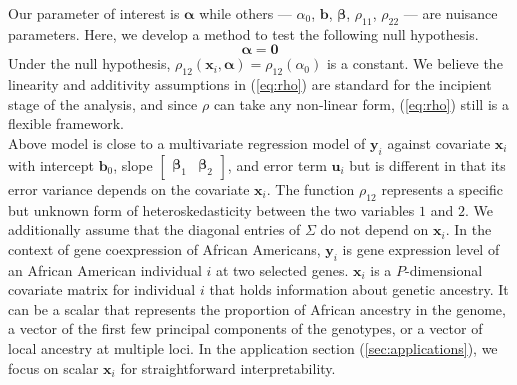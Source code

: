 \documentclass[aap, preprint]{imsart}
\numberwithin{equation}{section}
\theoremstyle{plain}
\begin{document}
Our parameter of interest is $\bm{\alpha}$ while others --- $\alpha_0$, $\bm{b}$, $\bm{\beta}$, $\rho_{11}$, $\rho_{22}$ --- are nuisance parameters. Here, we develop a method to test the following null hypothesis.
\begin{equation}
    \bm{\alpha} = \bm{0}
    \label{eq:null}
\end{equation}
Under the null hypothesis, $\rho_{12}(\bm{x}_i, \bm{\alpha}) = \rho_{12}(\alpha_0)$ is a constant. We believe the linearity and additivity assumptions in (\ref{eq:rho}) are standard for the incipient stage of the analysis, and since $\rho$ can take any non-linear form, (\ref{eq:rho}) still is a flexible framework. \\

Above model is close to a multivariate regression model of $\bm{y}_i$ against covariate $\bm{x}_i$ with intercept $\bm{b}_0$, slope $\begin{bmatrix} \bm{\beta}_1 & \bm{\beta}_2 \end{bmatrix}$, and error term $\bm{u}_i$ but is different in that its error variance depends on the covariate $\bm{x}_i$. The function $\rho_{12}$ represents a specific but unknown form of heteroskedasticity between the two variables $1$ and $2$. We additionally assume that the diagonal entries of $\Sigma$ do not depend on $\bm{x}_i$. In the context of gene coexpression of African Americans, $\bm{y}_i$ is gene expression level of an African American individual $i$ at two selected genes. $\bm{x}_i$ is a $P$-dimensional covariate matrix for individual $i$ that holds information about genetic ancestry. It can be a scalar that represents the proportion of African ancestry in the genome, a vector of the first few principal components of the genotypes, or a vector of local ancestry at multiple loci. In the application section (\ref{sec:applications}), we focus on scalar $\bm{x}_i$ for straightforward interpretability. \\

\end{document}
